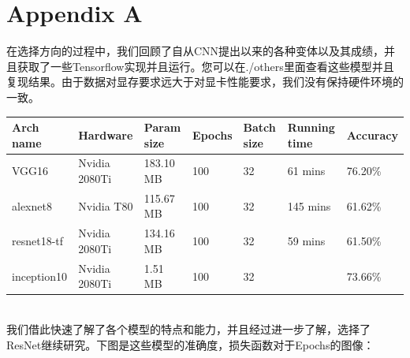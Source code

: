\documentclass[hyperref, UTF8, 12pt]{article}
\theoremstyle{definition}
\begin{document}
\section{Appendix A}
在选择方向的过程中，我们回顾了自从CNN提出以来的各种变体以及其成绩，并且获取了一些Tensorflow实现并且运行。您可以在./others里面查看这些模型并且复现结果。由于数据对显存要求远大于对显卡性能要求，我们没有保持硬件环境的一致。
\begin{table}[h]
	\begin{tabular}{|l|l|l|l|l|l|l|}
		\hline
		Arch name   & Hardware      & Param size & Epochs & Batch size & Running time & Accuracy \\ \hline
		VGG16       & Nvidia 2080Ti & 183.10 MB  & 100    & 32         & 61 mins      & 76.20\%  \\ \hline
		alexnet8    & Nvidia T80    & 115.67 MB  & 100    & 32         & 145 mins     & 61.62\%  \\ \hline
		resnet18-tf & Nvidia 2080Ti & 134.16 MB  & 100    & 32         & 59 mins     & 61.50\%    \\ \hline
		inception10 & Nvidia 2080Ti & 1.51 MB    & 100    & 32         &              &  73.66\%    \\ \hline
	\end{tabular}
\end{table}
\\
\indent
我们借此快速了解了各个模型的特点和能力，并且经过进一步了解，选择了ResNet继续研究。下图是这些模型的准确度，损失函数对于Epochs的图像：
\end{document}
